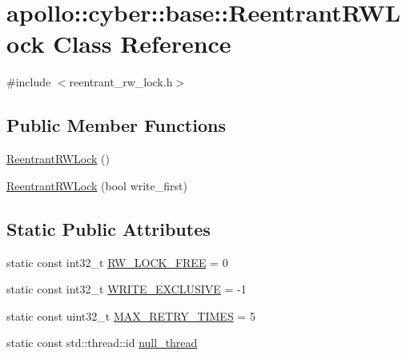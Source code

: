 \hypertarget{classapollo_1_1cyber_1_1base_1_1ReentrantRWLock}{\section{apollo\-:\-:cyber\-:\-:base\-:\-:Reentrant\-R\-W\-Lock Class Reference}
\label{classapollo_1_1cyber_1_1base_1_1ReentrantRWLock}
}


{\ttfamily \#include $<$reentrant\-\_\-rw\-\_\-lock.\-h$>$}

\subsection*{Public Member Functions}
\begin{DoxyCompactItemize}
\item 
\hyperlink{classapollo_1_1cyber_1_1base_1_1ReentrantRWLock_afb5cf9b3147e418d7ea56bd95faef907}{Reentrant\-R\-W\-Lock} ()
\item 
\hyperlink{classapollo_1_1cyber_1_1base_1_1ReentrantRWLock_a54c6a03f86a85c28ac1b98affd4c6c77}{Reentrant\-R\-W\-Lock} (bool write\-\_\-first)
\end{DoxyCompactItemize}
\subsection*{Static Public Attributes}
\begin{DoxyCompactItemize}
\item 
static const int32\-\_\-t \hyperlink{classapollo_1_1cyber_1_1base_1_1ReentrantRWLock_a1ea3a1cbc79ba78a79fbf965b74d03e5}{R\-W\-\_\-\-L\-O\-C\-K\-\_\-\-F\-R\-E\-E} = 0
\item 
static const int32\-\_\-t \hyperlink{classapollo_1_1cyber_1_1base_1_1ReentrantRWLock_af20aa8c75a72b20ab6863f77e436b04d}{W\-R\-I\-T\-E\-\_\-\-E\-X\-C\-L\-U\-S\-I\-V\-E} = -\/1
\item 
static const uint32\-\_\-t \hyperlink{classapollo_1_1cyber_1_1base_1_1ReentrantRWLock_ad21e7730e6c0803b54bb17d409de3991}{M\-A\-X\-\_\-\-R\-E\-T\-R\-Y\-\_\-\-T\-I\-M\-E\-S} = 5
\item 
static const std\-::thread\-::id \hyperlink{classapollo_1_1cyber_1_1base_1_1ReentrantRWLock_a77a2185c1f0ba187bd45e3fd51dd4425}{null\-\_\-thread}
\end{DoxyCompactItemize}

